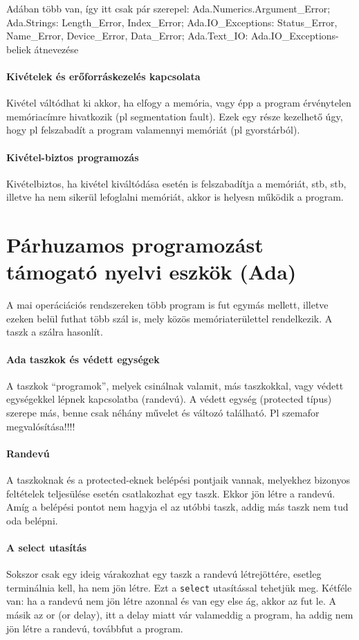 \documentclass[fleqn,10pt,a4paper]{article}
\newcommand{\ut}[1]{\texttt{#1}}
\theoremstyle{magyar}
\begin{document}
  Adában több van, így itt csak pár szerepel:
  Ada.Numerics.Argument\_Error; Ada.Strings: Length\_Error, Index\_Error;
  Ada.IO\_Exceptions: Status\_Error, Name\_Error, Device\_Error,
  Data\_Error;
  Ada.Text\_IO: Ada.IO\_Exceptions-beliek átnevezése

  \paragraph{Kivételek és erőforráskezelés kapcsolata}
  Kivétel váltódhat ki akkor, ha elfogy a memória, vagy épp a program
  érvénytelen memóriacímre hivatkozik (pl segmentation fault). Ezek
  egy része kezelhető úgy, hogy pl felszabadít a program valamennyi
  memóriát (pl gyorstárból).
  
  \paragraph{Kivétel-biztos programozás}
  Kivételbiztos, ha kivétel kiváltódása esetén is felszabadítja a
  memóriát, stb, stb, illetve ha nem sikerül lefoglalni memóriát,
  akkor is helyesn működik a program.
  
  \newpage
  \section{Párhuzamos programozást támogató nyelvi eszkök (Ada)}
  A mai operáciációs rendszereken több program is fut egymás mellett,
  illetve ezeken belül futhat több szál is, mely közös
  memóriaterülettel rendelkezik. A taszk a szálra hasonlít.
  \paragraph{Ada taszkok és védett egységek}
  A taszkok ``programok'', melyek csinálnak valamit, más taszkokkal,
  vagy  védett egységekkel lépnek kapcsolatba (randevú). A védett
  egység (protected típus) szerepe más, benne csak néhány művelet és
  változó található. Pl szemafor megvalósítása!!!!

  \paragraph{Randevú}
  A taszkoknak és a protected-eknek belépési pontjaik vannak,
  melyekhez bizonyos feltételek teljesülése esetén csatlakozhat egy
  taszk. Ekkor jön létre a randevú. Amíg a belépési pontot nem hagyja
  el az utóbbi taszk, addig más taszk nem tud oda belépni. 
  \paragraph{A select utasítás}
  Sokszor csak egy ideig várakozhat egy taszk a randevú létrejöttére,
  esetleg terminálnia kell, ha nem jön létre. Ezt a \ut{select}
  utasítással tehetjük meg. Kétféle van: ha a randevú nem jön létre
  azonnal és van egy else ág, akkor az fut le. A másik az or (or
  delay), itt a delay miatt vár valameddig a program, ha addig nem jön
  létre a randevú, továbbfut a program.
\end{document}
